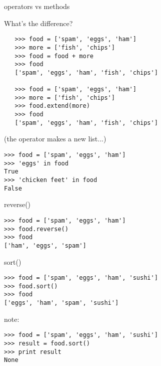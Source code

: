 \documentclass{beamer}
\begin{document}
\begin{frame}[fragile]{operators vs methods}

{\large What's the difference?}

\begin{verbatim}
   >>> food = ['spam', 'eggs', 'ham']
   >>> more = ['fish', 'chips']
   >>> food = food + more
   >>> food
   ['spam', 'eggs', 'ham', 'fish', 'chips']

   >>> food = ['spam', 'eggs', 'ham']
   >>> more = ['fish', 'chips']
   >>> food.extend(more)
   >>> food
   ['spam', 'eggs', 'ham', 'fish', 'chips']
\end{verbatim}
(the operator makes a new list...)

\end{frame} 

\begin{frame}[fragile]{in}

\begin{verbatim}
>>> food = ['spam', 'eggs', 'ham']
>>> 'eggs' in food
True
>>> 'chicken feet' in food
False
\end{verbatim}

\end{frame} 

\begin{frame}[fragile]{reverse()}


\begin{verbatim}
>>> food = ['spam', 'eggs', 'ham']
>>> food.reverse()
>>> food
['ham', 'eggs', 'spam']
\end{verbatim}

\end{frame} 

\begin{frame}[fragile]{sort()}

\vfill
\begin{verbatim}
>>> food = ['spam', 'eggs', 'ham', 'sushi']
>>> food.sort()
>>> food
['eggs', 'ham', 'spam', 'sushi']
\end{verbatim}

\vfill
{\Large note:}

\vfill
\begin{verbatim}
>>> food = ['spam', 'eggs', 'ham', 'sushi']
>>> result = food.sort()
>>> print result
None
\end{verbatim}

\vfill
\end{frame} 
\end{document}
